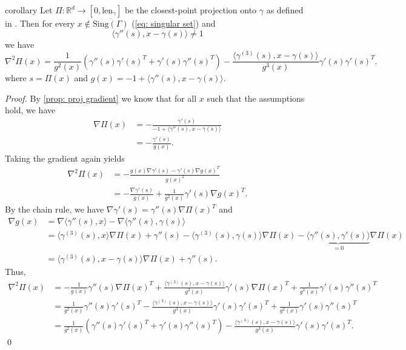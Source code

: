 \documentclass[11pt]{article}
\begin{document}
\begin{restatable}{corollary}{} \label{prop: proj hessian}
    Let $\Pi: \mathbb{R}^d \rightarrow [0, \text{len}_{\gamma}]$ be the closest-point projection onto $\gamma$ as defined in . Then for every $x \notin \overline{\text{Sing}(\Gamma)}$ (\cref{eq: singular set}) and 
    \[\langle\gamma''(s), x - \gamma(s)\rangle \neq 1\]
    we have
    \[\nabla^2\Pi(x) = \frac{1}{g^2(x)}\left(\gamma''(s)\gamma'(s)^T + \gamma'(s)\gamma''(s)^T\right)- \frac{\langle\gamma^{(3)}(s), x - \gamma(s)\rangle}{g^3(x)}\gamma'(s)\gamma'(s)^T.\]
    where $s = \Pi(x)$ and $g(x) = -1 + \langle\gamma''(s), x-\gamma(s)\rangle$.
\end{restatable}
\noindent \textit{Proof.} By \cref{prop: proj gradient} we know that for all $x$ such that the assumptions hold, we have
\begin{align}
    \nabla\Pi(x) &= -\frac{\gamma'(s)}{-1 + \langle\gamma''(s), x - \gamma(s)\rangle} \\
    &= -\frac{\gamma'(s)}{g(x)}.
\end{align}
Taking the gradient again yields
\begin{align}
    \nabla^2\Pi(x) &= -\frac{g(x)\nabla \gamma'(s) - \gamma'(s)\nabla g(x)^T}{g(x)^2} \\
    &= -\frac{\nabla \gamma'(s)}{g(x)} + \frac{1}{g^2(x)}\gamma'(s)\nabla g(x)^T.
\end{align}
By the chain rule, we have $\nabla\gamma'(s) = \gamma''(s)\nabla\Pi(x)^T$ and 
\begin{align}
    \nabla g(x) &= \nabla\langle\gamma''(s), x\rangle -\nabla\langle \gamma''(s), \gamma(s)\rangle \\
    &= \langle \gamma^{(3)}(s), x\rangle \nabla\Pi(x) + \gamma''(s) - \langle\gamma^{(3)}(s), \gamma(s)\rangle\nabla\Pi(x) - \underbrace{\langle\gamma''(s), \gamma'(s)\rangle}_{= 0}\nabla\Pi(x) \\
    &= \langle\gamma^{(3)}(s), x - \gamma(s)\rangle\nabla\Pi(x) + \gamma''(s).
\end{align}
Thus,
\begin{align*}
    \nabla^2\Pi(x) &= -\frac{1}{g(x)}\gamma''(s)\nabla\Pi(x)^T + \frac{\langle\gamma^{(3)}(s), x - \gamma(s)\rangle}{g^2(x)}\gamma'(s)\nabla\Pi(x)^T + \frac{1}{g^2(x)}\gamma'(s)\gamma''(s)^T \\
    &= \frac{1}{g^2(x)}\gamma''(s)\gamma'(s)^T - \frac{\langle\gamma^{(3)}(s), x - \gamma(s)\rangle}{g^3(x)}\gamma'(s)\gamma'(s)^T + \frac{1}{g^2(x)}\gamma'(s)\gamma''(s)^T \\
    &= \frac{1}{g^2(x)}\left(\gamma''(s)\gamma'(s)^T + \gamma'(s)\gamma''(s)^T\right)- \frac{\langle\gamma^{(3)}(s), x - \gamma(s)\rangle}{g^3(x)}\gamma'(s)\gamma'(s)^T.
\end{align*}
\qed{}
\end{document}
